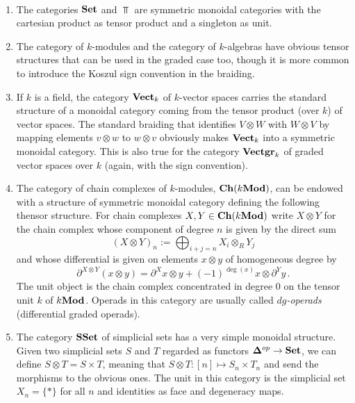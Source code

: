 \documentclass[TFM.tex]{subfiles}
\begin{document}
\begin{ex}\
\begin{enumerate}
\item The categories $\mathrm{\mathbf{Set}}$ and $\Top$ are symmetric monoidal categories with the cartesian product as tensor product and a singleton as unit.

\item The category of $k$-modules and the category of $k$-algebras have obvious tensor structures that can be used in the graded case too, though it is more common to introduce the Koszul sign convention in the braiding.  
\item If $k$ is a field, the category $\mathrm{\mathbf{Vect}}_k$ of $k$-vector spaces carries the standard structure of a monoidal category coming from the tensor product (over $k$) of vector spaces. The standard braiding that identifies $V\otimes W$ with $W\otimes V$ by mapping elements $v\otimes w$ to $w\otimes v$ obviously makes $\mathrm{\mathbf{Vect}}_k$ into a symmetric monoidal category. This is also true for the category $\mathrm{\mathbf{Vectgr}}_k$ of graded vector spaces over $k$ (again, with the sign convention).





\item The category of chain complexes of $k$-modules, $\mathrm{\mathbf{Ch}}(k\mathrm{\mathbf{Mod}})$, can be endowed with a structure of symmetric monoidal category defining the following thensor structure. For chain complexes $X,Y\in\mathrm{\mathbf{Ch}}(k\mathrm{\mathbf{Mod}})$ write $X\otimes Y$ for the chain complex whose component of degree $n$ is given by the direct sum
\[
(X \otimes Y)_n := \bigoplus_{i + j = n} X_i \otimes_R Y_j
\]
and whose differential is given on elements $x\otimes y$ of homogeneous degree by
\[
\partial^{X \otimes Y} (x\otimes y) = \partial^X x\otimes y + 
  (-1)^{\deg(x)} x\otimes\partial^Y y
  \,.
\]
The unit object is the chain complex concentrated in degree 0 on the tensor unit $k$ of $k\mathrm{\mathbf{Mod}}$. Operads in this category are usually called \emph{$dg$-operads} (differential graded operads). 

\item The category $\mathrm{\mathbf{SSet}}$ of simplicial sets has a very simple monoidal structure. Given two simplicial sets $S$ and $T$ regarded as functors $\mathbf{\Delta}^{op}\to\mathrm{\mathbf{Set}}$, we can define $S\otimes T=S\times T$, meaning that $S\otimes T:[n]\mapsto S_n\times T_n$ and send the morphisms to the obvious ones. The unit in this category is the simplicial set $X_n=\{*\}$ for all $n$ and identities as face and degeneracy maps. 


\end{enumerate}
\end{ex}
\end{document}
